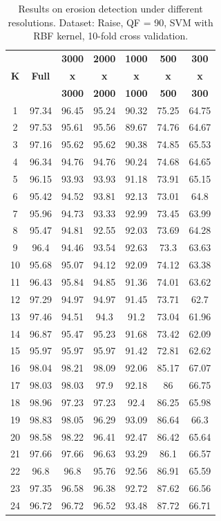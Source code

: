 \documentclass[review]{elsarticle}
\begin{document}
\begin{table}[!t]
	\centering
	\caption{Results on erosion detection under different resolutions. Dataset: Raise, QF = 90, SVM with RBF kernel, 10-fold cross validation.}
	\label{table:resolutionerosion}
	\begin{tabular}{c|cccccc}
		\hline\hline
		& &\textbf{3000}&\textbf{2000}&\textbf{1000}&\textbf{500}&\textbf{300}\\
		\textbf{K}&\textbf{Full}&\textbf{x}&\textbf{x}&\textbf{x}&\textbf{x}&\textbf{x}\\
		&&\textbf{3000}&\textbf{2000}&\textbf{1000}&\textbf{500}&\textbf{300}\\
		\hline
		1&97.34&96.45&95.24&90.32&75.25&64.75\\
		2&97.53&95.61&95.56&89.67&74.76&64.67\\
		3&97.16&95.62&95.62&90.38&74.85&65.53\\
		4&96.34&94.76&94.76&90.24&74.68&64.65\\
		5&96.15&93.93&93.93&91.18&73.91&65.15\\
		6&95.42&94.52&93.81&92.13&73.01&64.8\\
		7&95.96&94.73&93.33&92.99&73.45&63.99\\
		8&95.47&94.81&92.55&92.03&73.69&64.28\\
		9&96.4&94.46&93.54&92.63&73.3&63.63\\
		10&95.68&95.07&94.12&92.09&74.12&63.38\\
		11&96.43&95.84&94.85&91.36&74.01&63.62\\
		12&97.29&94.97&94.97&91.45&73.71&62.7\\
		13&97.46&94.51&94.3&91.2&73.04&61.96\\
		14&96.87&95.47&95.23&91.68&73.42&62.09\\
		15&95.97&95.97&95.97&91.42&72.81&62.62\\
		16&98.04&98.21&98.09&92.06&85.17&67.07\\
		17&98.03&98.03&97.9&92.18&86&66.75\\
		18&98.96&97.23&97.23&92.4&86.25&65.98\\
		19&98.83&98.05&96.29&93.09&86.64&66.3\\
		20&98.58&98.22&96.41&92.47&86.42&65.64\\
		21&97.66&97.66&96.63&93.29&86.1&66.57\\
		22&96.8&96.8&95.76&92.56&86.91&65.59\\
		23&97.35&96.58&96.38&92.72&87.62&66.56\\
		24&96.72&96.72&96.52&93.48&87.72&66.71\\

\end{tabular}
\end{table}
\end{document}
